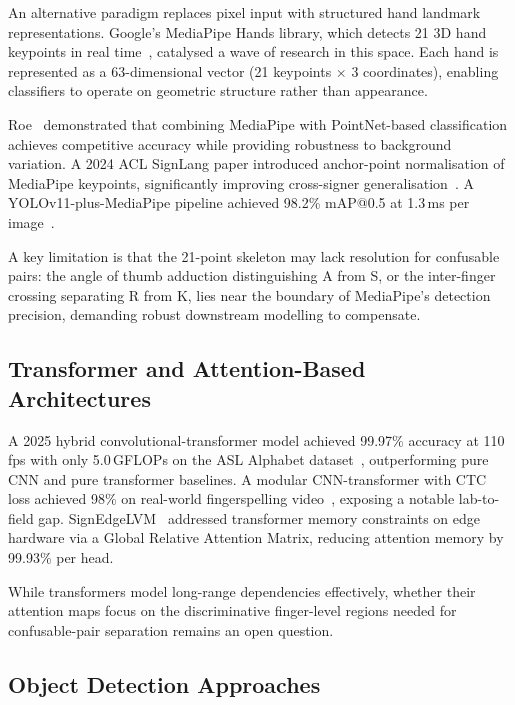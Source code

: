 \documentclass[conference]{IEEEtran}
\begin{document}
An alternative paradigm replaces pixel input with structured hand landmark
representations. Google's MediaPipe Hands library, which detects 21 3D
hand keypoints in real time~\cite{zhang2020mediapipe}, catalysed a wave of
research in this space. Each hand is represented as a 63-dimensional vector
(21 keypoints $\times$ 3 coordinates), enabling classifiers to operate on
geometric structure rather than appearance.

Roe~\cite{roe2022} demonstrated that combining MediaPipe with PointNet-based
classification achieves competitive accuracy while providing robustness to
background variation. A 2024 ACL SignLang paper introduced anchor-point
normalisation of MediaPipe keypoints, significantly improving cross-signer
generalisation~\cite{tornay2024}. A YOLOv11-plus-MediaPipe pipeline achieved
98.2\% mAP@0.5 at 1.3\,ms per image~\cite{park2025}.

A key limitation is that the 21-point skeleton may lack resolution for
confusable pairs: the angle of thumb adduction distinguishing A from S, or the
inter-finger crossing separating R from K, lies near the boundary of MediaPipe's
detection precision, demanding robust downstream modelling to compensate.

\subsection{Transformer and Attention-Based Architectures}

A 2025 hybrid convolutional-transformer model achieved 99.97\% accuracy at
110\,fps with only 5.0\,GFLOPs on the ASL Alphabet dataset~\cite{hassan2025},
outperforming pure CNN and pure transformer baselines. A modular CNN-transformer
with CTC loss achieved 98\% on real-world fingerspelling video~\cite{tf2023},
exposing a notable lab-to-field gap. SignEdgeLVM~\cite{signeEdgeLVM2025}
addressed transformer memory constraints on edge hardware via a Global Relative
Attention Matrix, reducing attention memory by 99.93\% per head.

While transformers model long-range dependencies effectively, whether their
attention maps focus on the discriminative finger-level regions needed for
confusable-pair separation remains an open question.

\subsection{Object Detection Approaches}
\end{document}
